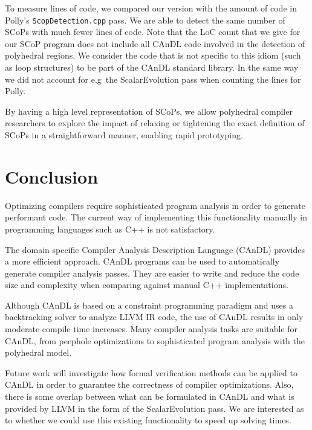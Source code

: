     To measure lines of code, we compared our version with the amount of code in
    Polly's \texttt{ScopDetection.cpp} pass.
    We are able to detect the same number of SCoPs with much fewer lines of
    code.
    Note that the LoC count that we give for our SCoP program does not include
    all CAnDL code involved in the detection of polyhedral regions.
    We consider the code that is not specific to this idiom (such as loop
    structures) to be part of the CAnDL standard library.
    In the same way we did not account for e.g\ the ScalarEvolution pass when
    counting the lines for Polly.

    By having a high level representation of SCoPs, we allow polyhedral compiler
    researchers to explore the impact of relaxing or tightening the exact
    definition of SCoPs in a straightforward manner, enabling rapid prototyping.


\begin{figure}[ht]
    
    \label{fig:candlvspolly}
\end{figure}

\section{Conclusion}

    Optimizing compilers require sophisticated program analysis in order to
    generate performant code.
    The current way of implementing this functionality manually in programming
    languages such as C++ is not satisfactory.

    The domain specific Compiler Analysis Description Language (CAnDL) provides
    a more efficient approach.
    CAnDL programs can be used to automatically generate compiler analysis
    passes.
    They are easier to write and reduce the code size and complexity when
    comparing against manual C++ implementations.

    Although CAnDL is based on a constraint programming paradigm and uses a
    backtracking solver to analyze LLVM IR code, the use of CAnDL results in
    only moderate compile time increases.
    Many compiler analysis tasks are suitable for CAnDL, from
    peephole optimizations to sophisticated program analysis with the polyhedral
    model.

    Future work will investigate how formal verification methods can be
    applied to CAnDL in order to guarantee the correctness of compiler
    optimizations.
    Also, there is some overlap between what can be formulated in CAnDL and what
    is provided by LLVM in the form of the ScalarEvolution pass.
    We are interested as to whether we could use this existing functionality to
    speed up solving times.